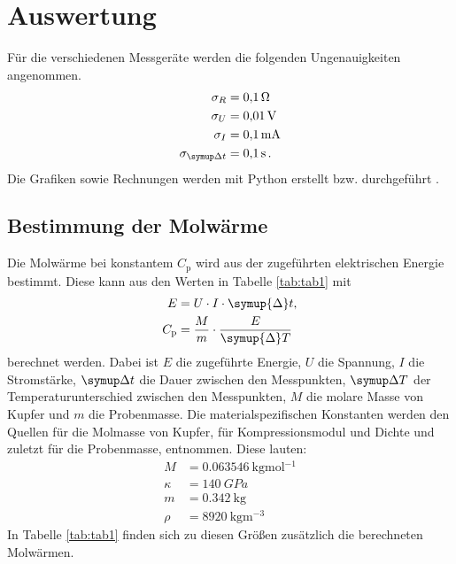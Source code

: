 \section{Auswertung}
\label{sec:Auswertung}
Für die verschiedenen Messgeräte werden die folgenden Ungenauigkeiten angenommen.
\begin{align*}
	\sigma_R &= \SI{0.1}{\ohm}\\
	\sigma_U &= \SI{0.01}{\volt}\\
	\sigma_I &= \SI{0.1}{\milli\ampere}\\
	\sigma_{\symup\Delta t} &= \SI{0.1}{\second}	\,\text.
\end{align*}
Die Grafiken sowie Rechnungen werden mit Python erstellt bzw. durchgeführt \cite{python}.
\subsection{Bestimmung der Molwärme}
Die Molwärme bei konstantem $C_\mathrm{p}$ wird aus der zugeführten elektrischen Energie bestimmt.
Diese kann aus den Werten in Tabelle \ref{tab:tab1} mit
\begin{align}
	E &= U \cdot I \cdot \symup{\Delta} t,\\
	C_\mathrm{p} &= \frac{M}{m}\cdot\frac{E}{\symup{\Delta} T}
	\label{eqn:cp}
\end{align}
berechnet werden.
Dabei ist $E$ die zugeführte Energie, $U$ die Spannung, $I$ die Stromstärke, $\symup\Delta t$ die Dauer zwischen den Messpunkten, $\symup\Delta T$ der Temperaturunterschied zwischen den Messpunkten, $M$ die molare Masse von Kupfer und $m$ die Probenmasse. Die materialspezifischen Konstanten werden den Quellen \cite{Anleitung4} für die Molmasse von Kupfer, \cite{Anleitung5} für Kompressionsmodul und Dichte und zuletzt \cite[4]{Anleitung} für die Probenmasse, entnommen. Diese lauten:
\begin{align*}
  M &= \SI{0.063546}{\kilo\gram\mol^{-1}} \\
  \kappa &= \SI{140}{GPa} \\
  m &= \SI{0.342}{\kilo\gram} \\
  \rho &= \SI{8920}{\kilo\gram\meter^{-3}}
\end{align*}
In Tabelle \ref{tab:tab1} finden sich zu diesen Größen zusätzlich die berechneten Molwärmen.
